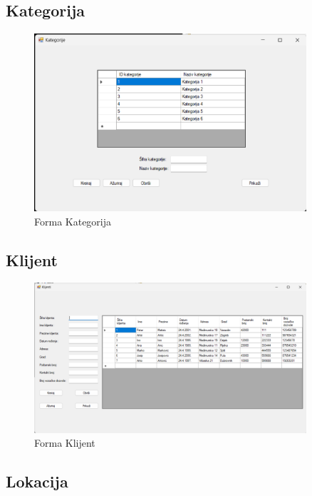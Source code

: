 \documentclass[]{foi} %
\begin{document}
\subsection{Kategorija}

\begin{figure}[!ht]
    \centering
    \includegraphics[width=0.9\textwidth]{slike/kategorija.png}
    \caption{Forma Kategorija}
    \label{fig:kategorija}
\end{figure}

\subsection{Klijent}

\begin{figure}[!ht]
    \centering
    \includegraphics[width=0.9\textwidth]{slike/klijent.png}
    \caption{Forma Klijent}
    \label{fig:klijent}
\end{figure}
\newpage

\subsection{Lokacija}
\end{document}

